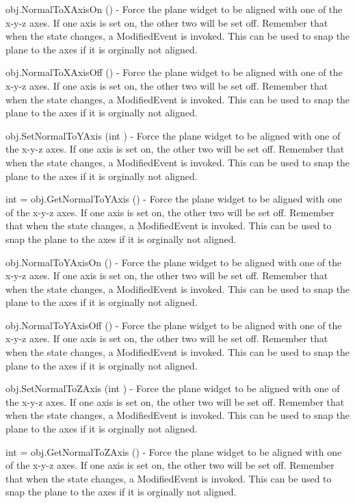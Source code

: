 \begin{DoxyItemize}
\item {\ttfamily obj.\-Normal\-To\-X\-Axis\-On ()} -\/ Force the plane widget to be aligned with one of the x-\/y-\/z axes. If one axis is set on, the other two will be set off. Remember that when the state changes, a Modified\-Event is invoked. This can be used to snap the plane to the axes if it is orginally not aligned.  
\item {\ttfamily obj.\-Normal\-To\-X\-Axis\-Off ()} -\/ Force the plane widget to be aligned with one of the x-\/y-\/z axes. If one axis is set on, the other two will be set off. Remember that when the state changes, a Modified\-Event is invoked. This can be used to snap the plane to the axes if it is orginally not aligned.  
\item {\ttfamily obj.\-Set\-Normal\-To\-Y\-Axis (int )} -\/ Force the plane widget to be aligned with one of the x-\/y-\/z axes. If one axis is set on, the other two will be set off. Remember that when the state changes, a Modified\-Event is invoked. This can be used to snap the plane to the axes if it is orginally not aligned.  
\item {\ttfamily int = obj.\-Get\-Normal\-To\-Y\-Axis ()} -\/ Force the plane widget to be aligned with one of the x-\/y-\/z axes. If one axis is set on, the other two will be set off. Remember that when the state changes, a Modified\-Event is invoked. This can be used to snap the plane to the axes if it is orginally not aligned.  
\item {\ttfamily obj.\-Normal\-To\-Y\-Axis\-On ()} -\/ Force the plane widget to be aligned with one of the x-\/y-\/z axes. If one axis is set on, the other two will be set off. Remember that when the state changes, a Modified\-Event is invoked. This can be used to snap the plane to the axes if it is orginally not aligned.  
\item {\ttfamily obj.\-Normal\-To\-Y\-Axis\-Off ()} -\/ Force the plane widget to be aligned with one of the x-\/y-\/z axes. If one axis is set on, the other two will be set off. Remember that when the state changes, a Modified\-Event is invoked. This can be used to snap the plane to the axes if it is orginally not aligned.  
\item {\ttfamily obj.\-Set\-Normal\-To\-Z\-Axis (int )} -\/ Force the plane widget to be aligned with one of the x-\/y-\/z axes. If one axis is set on, the other two will be set off. Remember that when the state changes, a Modified\-Event is invoked. This can be used to snap the plane to the axes if it is orginally not aligned.  
\item {\ttfamily int = obj.\-Get\-Normal\-To\-Z\-Axis ()} -\/ Force the plane widget to be aligned with one of the x-\/y-\/z axes. If one axis is set on, the other two will be set off. Remember that when the state changes, a Modified\-Event is invoked. This can be used to snap the plane to the axes if it is orginally not aligned.  

\end{DoxyItemize}
